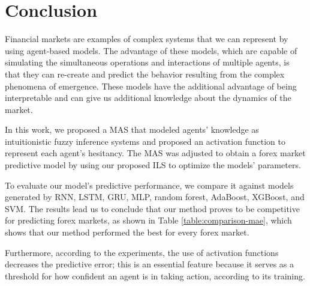 ﻿\documentclass{ieeeaccess}
\begin{document}
\section{Conclusion}
\label{section:conclusion}



Financial markets are examples of complex systems that we can represent by using
agent-based models. The advantage of these models, which are capable of simulating the
simultaneous operations and interactions of multiple agents, is that they can
re-create and predict the behavior resulting from the complex phenomena of
emergence. These models have the additional advantage of being interpretable and
can give us additional knowledge about the dynamics of the market.

In this work, we proposed a MAS that modeled agents' knowledge as intuitionistic
fuzzy inference systems and proposed an activation function to represent each
agent's hesitancy. The MAS was adjusted to obtain a forex market predictive
model by using our proposed ILS to optimize the models' parameters.

To evaluate our model's predictive performance, we compare it against
models generated by RNN, LSTM, GRU, MLP, random forest, AdaBoost,
XGBoost, and SVM. The results lead us to conclude that our method
proves to be competitive for predicting forex markets, as shown in
Table \ref{table:comparison-mae}, which shows that our method
performed the best for every forex market. 

Furthermore, according to the experiments, the use of activation functions
decreases the predictive error; this is an essential feature because it serves
as a threshold for how confident an agent is in taking action, according to its
training.
\end{document}
